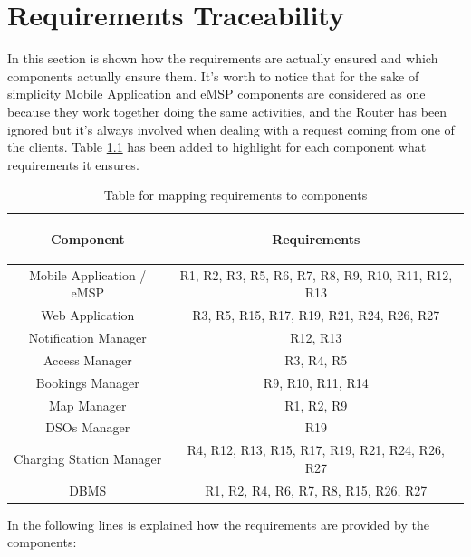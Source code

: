 \documentclass[a4paper]{report}
\begin{document}
\chapter{Requirements Traceability}
In this section is shown how the requirements are actually ensured and which components actually ensure them. It's worth to notice that for the sake of simplicity Mobile Application and eMSP components are considered as one because they work together doing the same activities, and the Router has been ignored  but it's always involved when dealing with a request coming from one of the clients.
Table \ref{tab:req-trace} has been added to highlight for each component what requirements it ensures.
\begin{table}[H]
  \centering
  \begin{tabular}{|c|c|}
    \cline{1-2}
   	\rule{0pt}{10pt}
   	\begin{large}
    \textbf{Component}
    \end{large}&\begin{large}
    \textbf{Requirements}
    \end{large}\\  \hline
    Mobile Application / eMSP &  R1, R2, R3, R5, R6, R7, R8, R9, R10, R11, R12, R13\\ \hline
    Web Application &  R3, R5, R15, R17, R19, R21, R24, R26, R27 \\ \hline
    Notification Manager &  R12, R13\\ \hline
    Access Manager & R3, R4, R5\\ \hline
    Bookings Manager & R9, R10, R11, R14\\ \hline
    Map Manager & R1, R2, R9 \\ \hline
    DSOs Manager &  R19\\ \hline
    Charging Station Manager & R4, R12, R13, R15, R17, R19, R21, R24, R26, R27 \\ \hline
    DBMS & R1, R2, R4, R6, R7, R8, R15, R26, R27 \\ \hline

  \end{tabular}
\caption{Table for mapping requirements to components} \label{tab:req-trace}
\end{table}
In the following lines is explained how the requirements are provided by the components:
\end{document}
